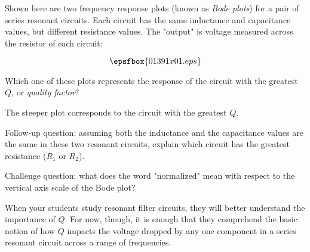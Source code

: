 

Shown here are two frequency response plots (known as {\it Bode plots}) for a pair of series resonant circuits.  Each circuit has the same inductance and capacitance values, but different resistance values.  The "output" is voltage measured across the resistor of each circuit:

$$\epsfbox{01391x01.eps}$$

Which one of these plots represents the response of the circuit with the greatest $Q$, or {\it quality factor}?







The steeper plot corresponds to the circuit with the greatest $Q$.

\vskip 10pt

Follow-up question: assuming both the inductance and the capacitance values are the same in these two resonant circuits, explain which circuit has the greatest resistance ($R_1$ or $R_2$).

\vskip 10pt

Challenge question: what does the word "normalized" mean with respect to the vertical axis scale of the Bode plot?







When your students study resonant filter circuits, they will better understand the importance of $Q$.  For now, though, it is enough that they comprehend the basic notion of how $Q$ impacts the voltage dropped by any one component in a series resonant circuit across a range of frequencies.




